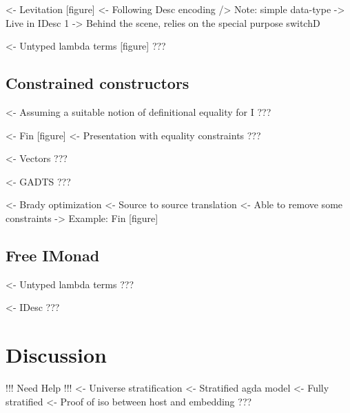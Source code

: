 \documentclass{article}
\newenvironment{structure}{\footnotesize\verbatim}{\endverbatim}
\begin{document}
\begin{structure}
<- Levitation [figure]
    <- Following Desc encoding
        /> Note: simple data-type
            -> Live in IDesc 1
    -> Behind the scene, relies on the special purpose switchD
\end{structure}

\begin{structure}
<- Untyped lambda terms [figure]
    ???
\end{structure}

\subsection{Constrained constructors}

\begin{structure}
<- Assuming a suitable notion of definitional equality for I
    ???
\end{structure}

\begin{structure}
<- Fin [figure]
    <- Presentation with equality constraints
    ???
\end{structure}

\begin{structure}
<- Vectors
    ???
\end{structure}

\begin{structure}
<- GADTS
    ???
\end{structure}

\begin{structure}
<- Brady optimization
    <- Source to source translation
    <- Able to remove some constraints
    -> Example: Fin [figure]
\end{structure}

\subsection{Free IMonad}

\begin{structure}
<- Untyped lambda terms
    ???
\end{structure}

\begin{structure}
<- IDesc
    ???
\end{structure}

\section{Discussion}

\begin{structure}
!!! Need Help !!!
<- Universe stratification
    <- Stratified agda model
        <- Fully stratified
        <- Proof of iso between host and embedding
    ???
\end{structure}
\end{document}
